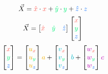 \documentclass[preview]{standalone}
\begin{document}
$$\vec{X} = \textcolor[HTML]{fe5e56}{\hat{x}}\cdot \textcolor[HTML]{fe5e56}{x} + \textcolor[HTML]{00ef75}{\hat{y}}\cdot \textcolor[HTML]{00ef75}{y} + \textcolor[HTML]{0069fe}{\hat{z}}\cdot \textcolor[HTML]{0069fe}{z}$$
$$\vec{X} = \begin{bmatrix}\textcolor[HTML]{fe5e56}{\hat{x}}&\textcolor[HTML]{00ef75}{\hat{y}}&\textcolor[HTML]{0069fe}{\hat{z}}\end{bmatrix}\begin{bmatrix}\textcolor[HTML]{fe5e56}{x}\\\textcolor[HTML]{00ef75}{y}\\\textcolor[HTML]{0069fe}{z}\end{bmatrix}$$
$$\begin{bmatrix}\textcolor[HTML]{fe5e56}{x}\\\textcolor[HTML]{00ef75}{y}\\\textcolor[HTML]{0069fe}{z}\end{bmatrix} =
\begin{bmatrix}\textcolor[HTML]{efac00}{u}_{\textcolor[HTML]{fe5e56}{x}}\\\textcolor[HTML]{efac00}{u}_{\textcolor[HTML]{00ef75}{y}}\\\textcolor[HTML]{efac00}{u}_{\textcolor[HTML]{0069fe}{z}}\end{bmatrix}\textcolor[HTML]{efac00}{a} +
\begin{bmatrix}\textcolor[HTML]{00b4c4}{v}_{\textcolor[HTML]{fe5e56}{x}}\\\textcolor[HTML]{00b4c4}{v}_{\textcolor[HTML]{00ef75}{y}}\\\textcolor[HTML]{00b4c4}{v}_{\textcolor[HTML]{0069fe}{z}}\end{bmatrix}\textcolor[HTML]{00b4c4}{b} +
\begin{bmatrix}\textcolor[HTML]{ba00b2}{w}_{\textcolor[HTML]{fe5e56}{x}}\\\textcolor[HTML]{ba00b2}{w}_{\textcolor[HTML]{00ef75}{y}}\\\textcolor[HTML]{ba00b2}{w}_{\textcolor[HTML]{0069fe}{z}}\end{bmatrix}\textcolor[HTML]{ba00b2}{c}$$
\end{document}
